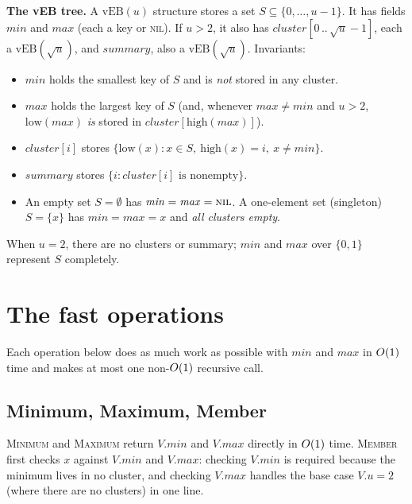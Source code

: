 \begin{formalbox}
\textbf{The vEB tree.} A $\text{vEB}(u)$ structure stores a set
$S \subseteq \{0,\dots,u-1\}$. It has fields $\mathit{min}$ and $\mathit{max}$
(each a key or \textsc{nil}). If $u > 2$, it also has
$\mathit{cluster}[0\,..\,\sqrt{u}-1]$, each a $\text{vEB}(\sqrt{u})$, and
$\mathit{summary}$, also a $\text{vEB}(\sqrt{u})$. Invariants:
\begin{itemize}
  \item $\mathit{min}$ holds the smallest key of $S$ and is \emph{not} stored in
        any cluster.
  \item $\mathit{max}$ holds the largest key of $S$ (and, whenever $\mathit{max} \ne \mathit{min}$ and $u > 2$, $\mathrm{low}(\mathit{max})$ \emph{is} stored in $\mathit{cluster}[\mathrm{high}(\mathit{max})]$).
  \item $\mathit{cluster}[i]$ stores $\{\mathrm{low}(x) : x \in S,\ \mathrm{high}(x)=i,\ x \ne \mathit{min}\}$.
  \item $\mathit{summary}$ stores $\{i : \mathit{cluster}[i] \text{ is nonempty}\}$.
  \item An empty set $S = \emptyset$ has $\mathit{min}=\mathit{max}=\textsc{nil}$. A one-element set (singleton)
        $S=\{x\}$ has $\mathit{min}=\mathit{max}=x$ and \emph{all clusters
        empty}.
\end{itemize}
When $u=2$, there are no clusters or summary; $\mathit{min}$ and $\mathit{max}$ over $\{0,1\}$ represent $S$ completely.
\end{formalbox}

\section{The fast operations}

Each operation below does as much work as possible with $\mathit{min}$ and $\mathit{max}$ in $O(1)$ time and makes at most one non-$O(1)$ recursive call.

\subsection{Minimum, Maximum, Member}

\textsc{Minimum} and \textsc{Maximum} return $V.\mathit{min}$ and
$V.\mathit{max}$ directly in $O(1)$ time. \textsc{Member} first checks $x$ against $V.\mathit{min}$ and $V.\mathit{max}$: checking $V.\mathit{min}$ is required because the minimum lives in no cluster, and checking $V.\mathit{max}$ handles the base case $V.u = 2$ (where there are no clusters) in one line.

